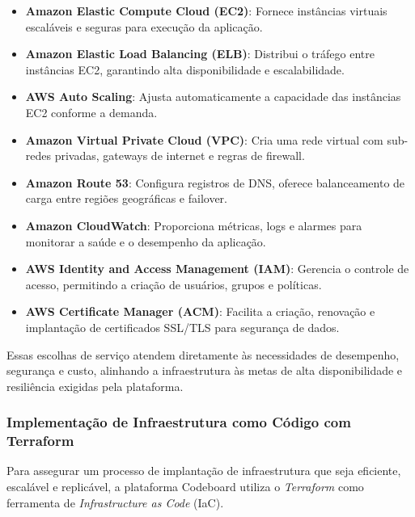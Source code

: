 \begin{itemize}
    \item \textbf{Amazon Elastic Compute Cloud (EC2)}: Fornece instâncias virtuais escaláveis e seguras para execução da aplicação.
    \item \textbf{Amazon Elastic Load Balancing (ELB)}: Distribui o tráfego entre instâncias EC2, garantindo alta disponibilidade e escalabilidade.
    \item \textbf{AWS Auto Scaling}: Ajusta automaticamente a capacidade das instâncias EC2 conforme a demanda.
    \item \textbf{Amazon Virtual Private Cloud (VPC)}: Cria uma rede virtual com sub-redes privadas, gateways de internet e regras de firewall.
    \item \textbf{Amazon Route 53}: Configura registros de DNS, oferece balanceamento de carga entre regiões geográficas e failover.
    \item \textbf{Amazon CloudWatch}: Proporciona métricas, logs e alarmes para monitorar a saúde e o desempenho da aplicação.
    \item \textbf{AWS Identity and Access Management (IAM)}: Gerencia o controle de acesso, permitindo a criação de usuários, grupos e políticas.
    \item \textbf{AWS Certificate Manager (ACM)}: Facilita a criação, renovação e implantação de certificados SSL/TLS para segurança de dados.
\end{itemize}

Essas escolhas de serviço atendem diretamente às necessidades de desempenho, segurança e custo, alinhando a infraestrutura às metas de alta disponibilidade e resiliência exigidas pela plataforma.


\subsubsection{Implementação de Infraestrutura como Código com Terraform}

Para assegurar um processo de implantação de infraestrutura que seja eficiente, escalável e replicável, a plataforma Codeboard utiliza o \emph{Terraform} como ferramenta de \emph{Infrastructure as Code} (IaC).

